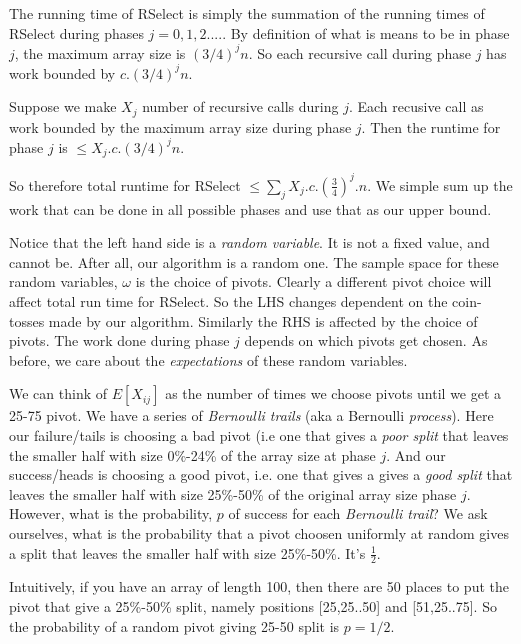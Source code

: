 The running time of RSelect is simply the summation of the 
running times of RSelect during phases $j = 0,1,2....$. 
By definition of what is means to be in phase $j$, the maximum array size is $(3/4)^{j}n$.  
So each recursive call during phase $j$ has work bounded by $c.(3/4)^{j}n$. 

Suppose we make $X_j$ number of recursive calls during $j$. 
Each recusive call as work bounded by the maximum array size during phase $j$. 
Then the runtime for phase $j$ is $\leqslant X_j.c.(3/4)^{j}n$.

So therefore total runtime for RSelect $\leqslant \sum_{j} X_j.c.(\frac{3}{4})^j.n$. 
We simple sum up the work that can be done 
in all possible phases and use that as our upper bound. 

Notice that the left hand side is a \textit{random variable}. 
It is not a fixed value, 
and cannot be. After all, our algorithm is a random one. 
The sample space for these random variables, $\omega$ is 
the choice of pivots. Clearly a different pivot choice  
will affect total run time for RSelect.  So the LHS 
changes dependent on the coin-tosses made by our algorithm. 
Similarly the RHS is affected by the choice of pivots. 
The work done during phase $j$ depends on which pivots get chosen. 
As before, we care about the \textit{expectations} of these random variables.


We can think of $E[X_{ij}]$ as the number of times we choose pivots until we get a 25-75 pivot. 
We have a series of \textit{Bernoulli trails} (aka a Bernoulli \textit{process}). 
Here our failure/tails is choosing a bad pivot (i.e one that 
gives a \textit{poor split} that leaves the smaller half with size 0\%-24\% of the array size at phase $j$.
And our success/heads is choosing a good pivot, i.e. one that 
gives a gives a \textit{good split} that leaves the smaller half with size 25\%-50\% 
of the original array size phase $j$. However, what is the probability, $p$ of success for 
each \textit{Bernoulli trail}? We ask ourselves, what is the probability 
that a pivot choosen uniformly at random gives a split that leaves the smaller half with size 25\%-50\%. 
It's $\frac{1}{2}$.


Intuitively, if you have an array of length 100, then there are 50 places 
to put the pivot that give a 25\%-50\% split, namely positions [25,25..50] 
and [51,25..75]. So the probability of a random pivot giving 25-50 split is $p = 1/2$. 

